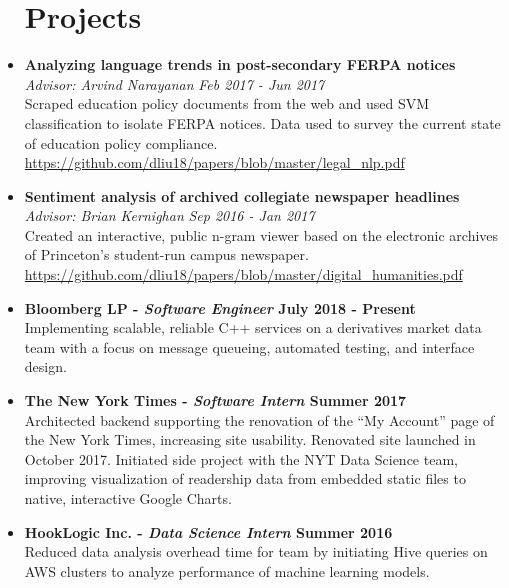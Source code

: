 \documentclass[margin]{res}
\begin{document}
\begin{resume}
\begin{itemize}
\section{Projects}
\item
{\bf Analyzing language trends in post-secondary FERPA notices} \\
\emph{Advisor: Arvind Narayanan} \emph{Feb 2017 - Jun 2017}\\
Scraped education policy documents from the web and used SVM classification to isolate FERPA notices. Data used to survey the current state of education policy compliance.\\
\url{https://github.com/dliu18/papers/blob/master/legal_nlp.pdf}\\

\item
{\bf Sentiment analysis of archived collegiate newspaper headlines}\\
\emph{Advisor: Brian Kernighan} \emph{Sep 2016 - Jan 2017}\\
Created an interactive, public n-gram viewer based on the electronic archives of Princeton's student-run campus newspaper. \\
\url{https://github.com/dliu18/papers/blob/master/digital_humanities.pdf}
\end{itemize}

\begin{itemize}
\section{Industry \\Experience}
\item 
{\bf Bloomberg LP - {\em{Software Engineer}} \hfill July 2018 - Present}\\
Implementing scalable, reliable C++ services on a derivatives market data team with a focus on message queueing, automated testing, and interface design.

\item
{\bf The New York Times - {\em{Software Intern}}  \hfill  Summer 2017}\\
Architected backend supporting the renovation of the “My Account” page of the New York Times, increasing site usability. Renovated site launched in October 2017. Initiated side project with the NYT Data Science team, improving visualization of readership data from embedded static files to native, interactive Google Charts.

\item
{\bf HookLogic Inc. - {\em{Data Science Intern}}  \hfill Summer 2016}\\
Reduced data analysis overhead time for team by initiating Hive queries on AWS clusters to analyze performance of machine learning models.
\end{itemize}



\end{resume}
\end{document}
